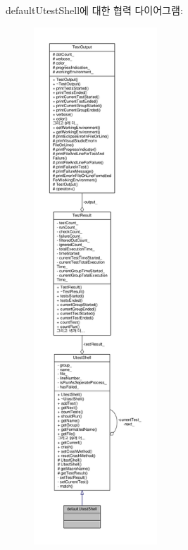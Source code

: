 default\+Utest\+Shell에 대한 협력 다이어그램\+:
\nopagebreak
\begin{figure}[H]
\begin{center}
\leavevmode
\includegraphics[height=550pt]{classdefault_utest_shell__coll__graph}
\end{center}
\end{figure}
